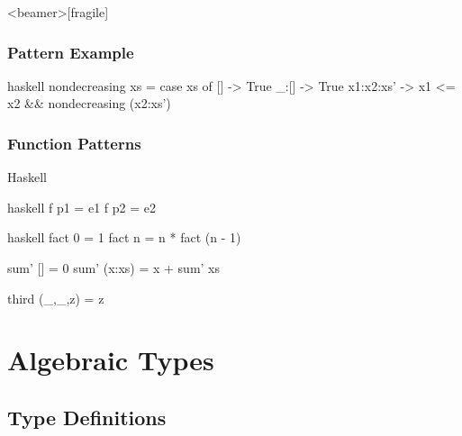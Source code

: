 \documentclass[dvipsnames]{beamer}
\theoremstyle{plain}
\begin{document}
\begin{frame}<beamer>[fragile]
  \frametitle{Pattern Example}

  \begin{example}
    \begin{pygments}{haskell}
nondecreasing xs =
    case xs of
      [] -> True
      _:[] -> True
      x1:x2:xs' -> x1 <= x2 && nondecreasing (x2:xs')
    \end{pygments}
  \end{example}
\end{frame}

\begin{frame}[fragile]
  \frametitle{Function Patterns}

  \begin{block}{Haskell}
    \begin{pygments}{haskell}
f p1 = e1
f p2 = e2
    \end{pygments}
  \end{block}

  \pause
  \begin{example}
    \begin{pygments}{haskell}
fact 0 = 1
fact n = n * fact (n - 1)

sum' [] = 0
sum' (x:xs) = x + sum' xs

third (_,_,z) = z
    \end{pygments}
  \end{example}
\end{frame}

\section{Algebraic Types}

\subsection{Type Definitions}
\end{document}
